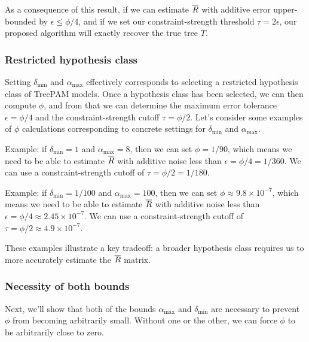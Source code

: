 \documentclass{article}
\theoremstyle{definition}
\newcommand{\deltaMin}{\delta_{\text{min}}}
\newcommand{\alphaMax}{\alpha_{\text{max}}}
\begin{document}
As a consequence of this result, if we can estimate $\overline{R}$ with additive error upper-bounded by $\epsilon \leq \phi/4$, and if we set our constraint-strength threshold $\tau = 2\epsilon$, our proposed algorithm will exactly recover the true tree $T$.


\subsubsection{Restricted hypothesis class}
Setting $\deltaMin$ and $\alphaMax$ effectively corresponds to selecting a restricted hypothesis class of TreePAM models.
Once a hypothesis class has been selected, we can then compute $\phi$, and from that we can determine the maximum error tolerance $\epsilon = \phi/4$ and the constraint-strength cutoff $\tau = \phi/2$.
Let's consider some examples of $\phi$ calculations corresponding to concrete settings for $\deltaMin$ and $\alphaMax$.

Example: if $\deltaMin = 1$ and $\alphaMax = 8$, then we can set $\phi = 1/90$, which means we need to be able to estimate $\overline{R}$ with additive noise less than $\epsilon = \phi/4 = 1/360$.
We can use a constraint-strength cutoff of $\tau = \phi/2 = 1/180$.

Example: if $\deltaMin = 1/100$ and $\alphaMax = 100$, then we can set $\phi \approx 9.8 \times 10^{-7}$, which means we need to be able to estimate $\overline{R}$ with additive noise less than $\epsilon = \phi/4 \approx 2.45 \times 10^{-7}$.
We can use a constraint-strength cutoff of $\tau = \phi/2 \approx 4.9 \times 10^{-7}$.

These examples illustrate a key tradeoff: a broader hypothesis class requires us to more accurately estimate the $\overline{R}$ matrix.


\subsubsection{Necessity of both bounds}
Next, we'll show that both of the bounds $\alphaMax$ and $\deltaMin$ are necessary to prevent $\phi$ from becoming arbitrarily small.
Without one or the other, we can force $\phi$ to be arbitrarily close to zero.
\end{document}
